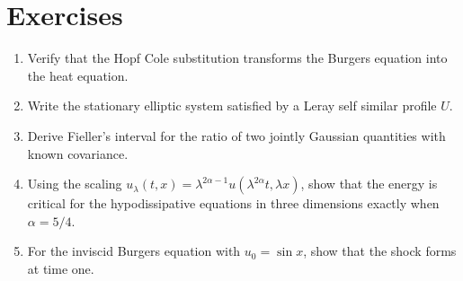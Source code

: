 \section*{Exercises}
\begin{enumerate}
\item Verify that the Hopf Cole substitution transforms the Burgers equation into the heat equation.
\item Write the stationary elliptic system satisfied by a Leray self similar profile $U$.
\item Derive Fieller's interval for the ratio of two jointly Gaussian quantities with known covariance.
\item Using the scaling $u_\lambda(t,x) = \lambda^{2\alpha-1}u(\lambda^{2\alpha}t,\lambda x)$, show that the energy is critical for the hypodissipative equations in three dimensions exactly when $\alpha = 5/4$.
\item For the inviscid Burgers equation with $u_0 = \sin x$, show that the shock forms at time one.
\end{enumerate}
